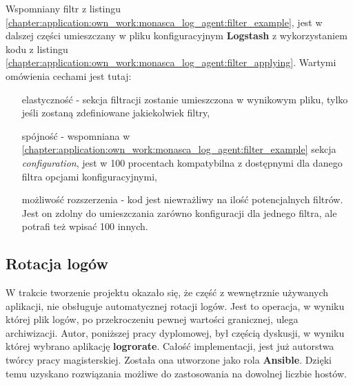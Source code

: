 Wspomniany filtr z listingu \ref{chapter:application:own_work:monasca_log_agent:filter_example}, jest w dalszej części umieszczany
w pliku konfiguracyjnym \textbf{Logstash} z wykorzystaniem kodu z listingu \ref{chapter:application:own_work:monasca_log_agent:filter_applying}. 
Wartymi omówienia cechami jest tutaj:
\begin{itemize}
    \item[elastyczność] - sekcja filtracji zostanie umieszczona w wynikowym pliku, tylko jeśli zostaną zdefiniowane jakiekolwiek filtry,
    \item[spójność] - wspomniana w \ref{chapter:application:own_work:monasca_log_agent:filter_example} sekcja \textit{configuration}, jest
    w 100 procentach kompatybilna z dostępnymi dla danego filtra opcjami konfiguracyjnymi,
    \item[możliwość rozszerzenia] - kod jest niewrażliwy na ilość potencjalnych filtrów. Jest on zdolny do umieszczania zarówno konfiguracji dla jednego
    filtra, ale potrafi też wpisać 100 innych. 
\end{itemize}

\subsection{Rotacja logów}
W trakcie tworzenie projektu okazało się, że część z wewnętrznie używanych aplikacji, nie obsługuje automatycznej rotacji logów. Jest
to operacja, w wyniku której plik logów, po przekroczeniu pewnej wartości granicznej, ulega archiwizacji. Autor, poniższej pracy dyplomowej,
był częścią dyskusji, w wyniku której wybrano aplikację \textbf{logrorate}. Całość implementacji, jest już autorstwa twórcy pracy magisterskiej.
Została ona utworzone jako rola \textbf{Ansible}. Dzięki temu uzyskano rozwiązania możliwe do zastosowania na dowolnej liczbie hostów.

